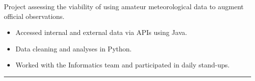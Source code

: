 \documentclass[10pt]{article}
\newenvironment{innerlist}[1][\enskip\textbullet]{
	\begin{itemize}[#1,leftmargin=*,rightmargin=30pt,parsep=0pt,itemsep=1pt,topsep=2pt,partopsep=0pt]
}{\end{itemize}}
\begin{document}

Project assessing the viability of using amateur meteorological data to augment official observations. \\

\vspace{-6pt}

\begin{innerlist}
	\item Accessed internal and external data via APIs using Java.
	\item Data cleaning and analyses in Python.
	\item Worked with the Informatics team and participated in daily stand-ups.
\end{innerlist} 







\vspace{1pt}
\begin{center}
		\rule{0.5\columnwidth}{1pt}
\end{center}
\vspace{-10pt}
\end{document}
